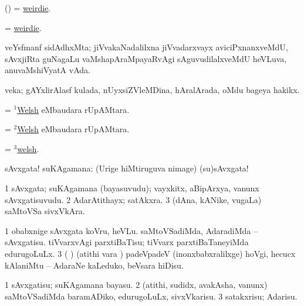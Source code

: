 \bentry
{} 
\gl{\nA}
\bmng
(\AmA) = \hyperlink{weirdie}{weirdie}. 
\emng
\eentry

\bentry
{} 
\gl{\nA}
\expl{}
\bmng
= \hyperlink{weirdie}{weirdie}. 
\emng
\eentry

\bentry
{} 
\gl{\nA}
\expl{}
\bmng
veYsfmanf sidAdhxMta; jiVvakaNadalilxna jiVvadarxvayx aviciPxnanxveMdU, sAvxjiRta guNagaLu vaMshapAraMpayaRvAgi sAguvudilalxveMdU heVLuva, anuvaMshiVyatA vAda. 
\emng
\eentry

\bentry
{} 
\gl{\nA}
\expl{}
\bmng
veka; gAYxlirAlasf kulada, nUyxsiZVleMDina, hAralArada, oMdu bageya hakikx. 
\emng
\eentry

\bentry
{} 
\gl{\gu}
\expl{}
\bmng
= \hyperlink{Welsh(1)}{$^1$Welsh} eMbaudara rUpAMtara. 
\emng
\eentry

\bentry
{} 
\gl{\nA}
\expl{}
\bmng
= \hyperlink{Welsh(2)}{$^2$Welsh} eMbaudara rUpAMtara. 
\emng
\eentry

\bentry
{} 
\gl{\akirx}
\expl{}
\bmng
= \hyperlink{welsh(3)}{$^3$welsh}. 
\emng
\eentry

\bentry
{} 
\gl{\BAavayx}
\expl{}
\bmng
sAvxgata! suKAgamana:  (Urige hiMtiruguva nimage) (su)sAvxgata! 
\emng
\eentry

\bentry
{} 
\gl{\nA}
\expl{}
\bmng
\bnum
\num{1} sAvxgata; suKAgamana (bayasuvudu); vayxkitx, aBipArxya, \mo vanunx sAvxgatisuvudu. 
\num{2} AdarAtithayx; satAkxra. 
\num{3} (dAna, kANike, \mo vugaLa) saMtoVSa sivxVkAra. 
\enum
\emng

\noindent 
\gl{\pagu}
\expl{}
\bmng
\bnum
\num{1}  obabxnige sAvxgata koVru, heVLu. 
  
\banum
{} saMtoVSadiMda, AdaradiMda -- sAvxgatisu. 
 tiVvarxvAgi parxtiBaTisu; tiVvarx parxtiBaTaneyiMda edurugoLuLx. 
\eanum
\numie
\num{3}  ( ) (atithi \mo vara \vi) padeVpadeV (inonxbabxralilxge) hoVgi, hecucx kAlaniMtu -- AdaraNe kaLeduko, beVsara hiDisu. 
\enum
\emng
\eentry

\bentry
{} 
\gl{\sakirx}
\expl{}
\bmng
\bnum
\num{1} sAvxgatisu; suKAgamana bayasu. 
\num{2} (atithi, sudidx, avakAsha, \mo vanunx) saMtoVSadiMda baramADiko, edurugoLuLx, sivxVkarisu. 
\num{3} satakxrisu; Adarisu. 
\enum
\emng
\eentry

